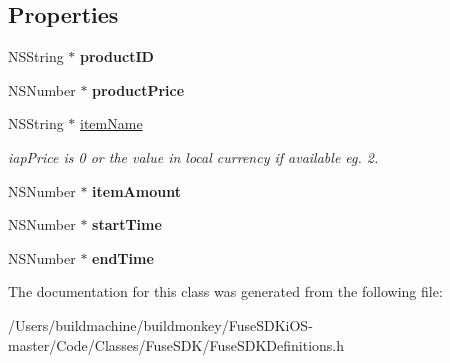 \subsection*{Properties}
\begin{DoxyCompactItemize}
\item 
\hypertarget{interface_fuse_i_a_p_offer_object_a571e791fe7952e6d533affcd141cf8d3}{}N\+S\+String $\ast$ {\bfseries product\+I\+D}\label{interface_fuse_i_a_p_offer_object_a571e791fe7952e6d533affcd141cf8d3}

\item 
\hypertarget{interface_fuse_i_a_p_offer_object_a8d1ea52ddcdc454acacd66c011a43341}{}N\+S\+Number $\ast$ {\bfseries product\+Price}\label{interface_fuse_i_a_p_offer_object_a8d1ea52ddcdc454acacd66c011a43341}

\item 
\hypertarget{interface_fuse_i_a_p_offer_object_afc44eae0ea1010ef7b02515dfc156e68}{}N\+S\+String $\ast$ \hyperlink{interface_fuse_i_a_p_offer_object_afc44eae0ea1010ef7b02515dfc156e68}{item\+Name}\label{interface_fuse_i_a_p_offer_object_afc44eae0ea1010ef7b02515dfc156e68}

\begin{DoxyCompactList}\small\item\em iap\+Price is 0 or the value in local currency if available eg. 2. \end{DoxyCompactList}\item 
\hypertarget{interface_fuse_i_a_p_offer_object_a3eb537b8ee870de5085c035c1de25a31}{}N\+S\+Number $\ast$ {\bfseries item\+Amount}\label{interface_fuse_i_a_p_offer_object_a3eb537b8ee870de5085c035c1de25a31}

\item 
\hypertarget{interface_fuse_i_a_p_offer_object_a498e28eb1d66c5f180a7c5b1821fa7de}{}N\+S\+Number $\ast$ {\bfseries start\+Time}\label{interface_fuse_i_a_p_offer_object_a498e28eb1d66c5f180a7c5b1821fa7de}

\item 
\hypertarget{interface_fuse_i_a_p_offer_object_a25d920dd9d75005ff4a80ea4cf1b8d53}{}N\+S\+Number $\ast$ {\bfseries end\+Time}\label{interface_fuse_i_a_p_offer_object_a25d920dd9d75005ff4a80ea4cf1b8d53}

\end{DoxyCompactItemize}


The documentation for this class was generated from the following file\+:\begin{DoxyCompactItemize}
\item 
/\+Users/buildmachine/buildmonkey/\+Fuse\+S\+D\+Ki\+O\+S-\/master/\+Code/\+Classes/\+Fuse\+S\+D\+K/Fuse\+S\+D\+K\+Definitions.\+h\end{DoxyCompactItemize}

